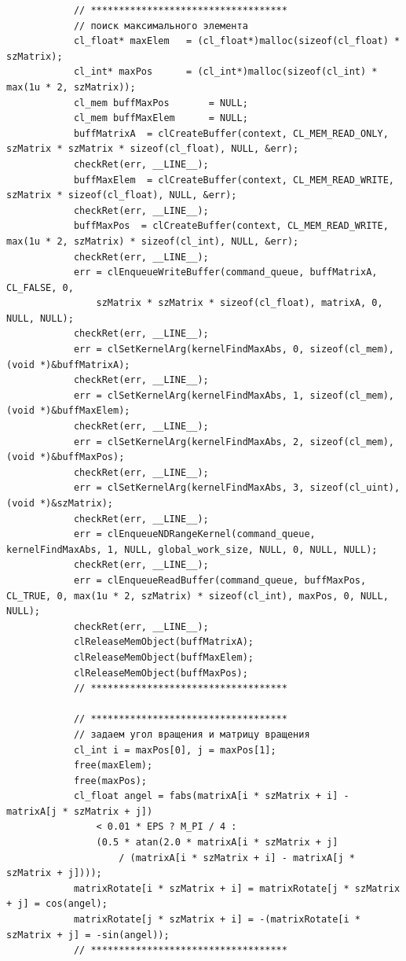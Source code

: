 \documentclass[utf8, 12pt, a4paper, oneside]{article}
\begin{document}
\begin{lstlisting}
			// ***********************************            
			// поиск максимального элемента 
            cl_float* maxElem   = (cl_float*)malloc(sizeof(cl_float) * szMatrix);
            cl_int* maxPos      = (cl_int*)malloc(sizeof(cl_int) * max(1u * 2, szMatrix));            
            cl_mem buffMaxPos       = NULL;
            cl_mem buffMaxElem      = NULL;
            buffMatrixA  = clCreateBuffer(context, CL_MEM_READ_ONLY, szMatrix * szMatrix * sizeof(cl_float), NULL, &err);
            checkRet(err, __LINE__);    
            buffMaxElem  = clCreateBuffer(context, CL_MEM_READ_WRITE, szMatrix * sizeof(cl_float), NULL, &err);
            checkRet(err, __LINE__);    
            buffMaxPos  = clCreateBuffer(context, CL_MEM_READ_WRITE, max(1u * 2, szMatrix) * sizeof(cl_int), NULL, &err);
            checkRet(err, __LINE__);    
            err = clEnqueueWriteBuffer(command_queue, buffMatrixA, CL_FALSE, 0, 
                szMatrix * szMatrix * sizeof(cl_float), matrixA, 0, NULL, NULL);        
            checkRet(err, __LINE__);
            err = clSetKernelArg(kernelFindMaxAbs, 0, sizeof(cl_mem), (void *)&buffMatrixA);
            checkRet(err, __LINE__);            
            err = clSetKernelArg(kernelFindMaxAbs, 1, sizeof(cl_mem), (void *)&buffMaxElem);
            checkRet(err, __LINE__);            
            err = clSetKernelArg(kernelFindMaxAbs, 2, sizeof(cl_mem), (void *)&buffMaxPos);
            checkRet(err, __LINE__);            
            err = clSetKernelArg(kernelFindMaxAbs, 3, sizeof(cl_uint), (void *)&szMatrix);
            checkRet(err, __LINE__);                      
            err = clEnqueueNDRangeKernel(command_queue, kernelFindMaxAbs, 1, NULL, global_work_size, NULL, 0, NULL, NULL);
            checkRet(err, __LINE__);
            err = clEnqueueReadBuffer(command_queue, buffMaxPos, CL_TRUE, 0, max(1u * 2, szMatrix) * sizeof(cl_int), maxPos, 0, NULL, NULL);
            checkRet(err, __LINE__);            
            clReleaseMemObject(buffMatrixA);    
            clReleaseMemObject(buffMaxElem);
            clReleaseMemObject(buffMaxPos);
			// ***********************************            

			// ***********************************            
			// задаем угол вращения и матрицу вращения            
            cl_int i = maxPos[0], j = maxPos[1];
            free(maxElem);
            free(maxPos);
            cl_float angel = fabs(matrixA[i * szMatrix + i] - matrixA[j * szMatrix + j])
                < 0.01 * EPS ? M_PI / 4 :
                (0.5 * atan(2.0 * matrixA[i * szMatrix + j]
                    / (matrixA[i * szMatrix + i] - matrixA[j * szMatrix + j])));
            matrixRotate[i * szMatrix + i] = matrixRotate[j * szMatrix + j] = cos(angel);
            matrixRotate[j * szMatrix + i] = -(matrixRotate[i * szMatrix + j] = -sin(angel));
			// ***********************************            
			

\end{lstlisting}
\end{document}
